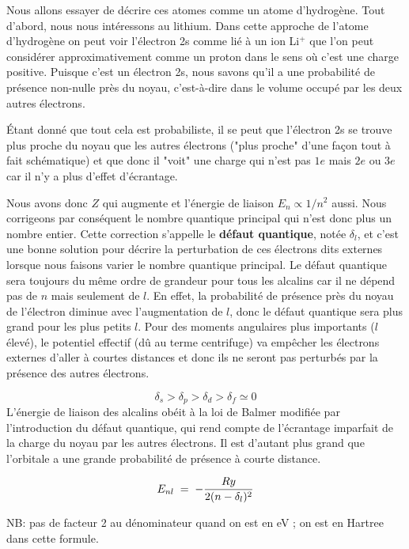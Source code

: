 Nous allons essayer de décrire ces atomes comme un atome d'hydrogène. Tout d'abord, nous nous intéressons au lithium. Dans cette approche de l'atome d'hydrogène on peut voir l'électron 2s comme lié à un ion Li$^{+}$ que l'on peut considérer approximativement comme un proton dans le sens où c'est une charge positive. Puisque c'est un électron 2s, nous savons qu'il a une probabilité de présence non-nulle près du noyau, c'est-à-dire dans le volume occupé par les deux autres électrons.


Étant donné que tout cela est probabiliste, il se peut que l'électron 2s se trouve plus proche du noyau que les autres électrons ("plus proche" d'une façon tout à fait schématique) et que donc il "voit" une charge qui n'est pas $1e$ mais $2e$ ou $3e$ car il n'y a plus d'effet d'écrantage.

Nous avons donc $Z$ qui augmente et l'énergie de liaison $E_n \propto 1/n^2$ aussi. Nous corrigeons par conséquent le nombre quantique principal qui n'est donc plus un nombre entier. Cette correction s’appelle le \textbf{défaut quantique}, notée $\delta_l$, et c’est une bonne solution pour décrire la perturbation de ces électrons dits externes lorsque nous faisons varier le nombre quantique principal.
Le défaut quantique sera toujours du même ordre de grandeur pour tous les alcalins car il ne dépend pas de $n$ mais seulement de $l$. En effet, la probabilité de présence près du noyau de l'électron diminue avec l'augmentation de $l$, donc le défaut quantique sera plus grand pour les plus petits $l$. Pour des moments angulaires plus importants ($l$ élevé), le potentiel effectif (dû au terme centrifuge) va empêcher les électrons externes d’aller à courtes distances et donc ils ne seront pas perturbés par la présence des autres électrons.

\[
    \delta_s>\delta_p>\delta_d>\delta_f\simeq 0
\]
L'énergie de liaison des alcalins obéit à la loi de Balmer modifiée par l’introduction du défaut quantique, qui rend compte de l’écrantage imparfait de la charge du noyau par les autres électrons. Il est d’autant plus grand que l’orbitale a une grande probabilité de présence à courte distance.

\begin{equation}
    E_{nl} \; = \;  - \dfrac{Ry}{2(n-\delta_l)^2}
    \label{eq:def_quant}
\end{equation}

NB: pas de facteur 2 au dénominateur quand on est en eV ; on est en Hartree dans cette formule.


